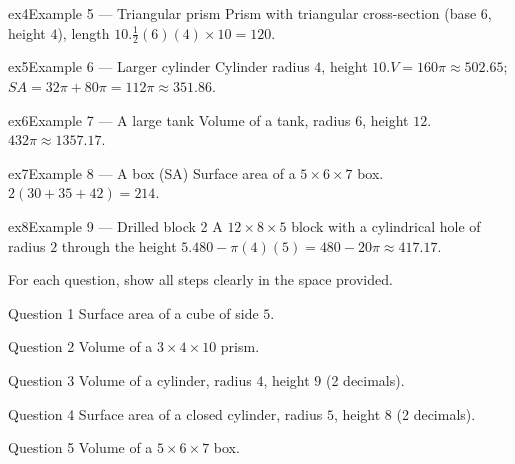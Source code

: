 \documentclass[11pt]{article}
\begin{document}
\begin{example}{ex4}{Example 5 --- Triangular prism}
Prism with triangular cross-section (base $6$, height $4$), length $10$.\soln $\tfrac12(6)(4)\times10=120$.
\end{example}

\begin{example}{ex5}{Example 6 --- Larger cylinder}
Cylinder radius $4$, height $10$.\soln $V=160\pi\approx502.65$; $SA=32\pi+80\pi=112\pi\approx351.86$.
\end{example}

\begin{example}{ex6}{Example 7 --- A large tank}
Volume of a tank, radius $6$, height $12$.\soln $432\pi\approx1357.17$.
\end{example}

\begin{example}{ex7}{Example 8 --- A box (SA)}
Surface area of a $5\times6\times7$ box.\soln $2(30+35+42)=214$.
\end{example}

\begin{example}{ex8}{Example 9 --- Drilled block 2}
A $12\times8\times5$ block with a cylindrical hole of radius $2$ through the height $5$.\soln $480-\pi(4)(5)=480-20\pi\approx417.17$.
\end{example}

\clearpage
{}
For each question, show all steps clearly in the space provided.

\begin{qbox}{Question 1}
Surface area of a cube of side $5$.\workspace{2.4cm}
\end{qbox}

\begin{qbox}{Question 2}
Volume of a $3\times4\times10$ prism.\workspace{2.4cm}
\end{qbox}

\begin{qbox}{Question 3}
Volume of a cylinder, radius $4$, height $9$ (2 decimals).\workspace{2.4cm}
\end{qbox}

\begin{qbox}{Question 4}
Surface area of a closed cylinder, radius $5$, height $8$ (2 decimals).\workspace{2.4cm}
\end{qbox}

\begin{qbox}{Question 5}
Volume of a $5\times6\times7$ box.\workspace{2.4cm}
\end{qbox}
\end{document}
